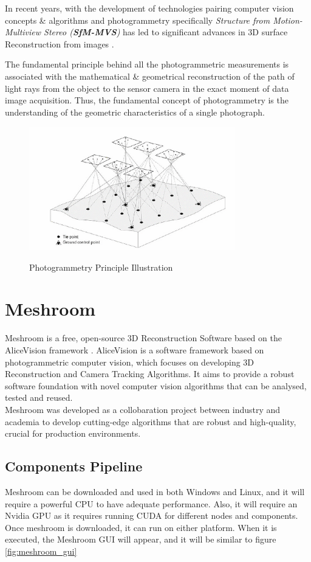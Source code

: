 \documentclass[12pt]{report}
\begin{document}
In recent years, with the development of technologies pairing computer vision concepts \& algorithms and photogrammetry specifically \textit{Structure from Motion-Multiview Stereo (\textbf{SfM-MVS})}
has led to significant advances in 3D surface Reconstruction from images .

The fundamental principle behind all the photogrammetric measurements is associated with the mathematical \& geometrical reconstruction of the path of light rays from the object to the sensor camera in the exact moment of data image acquisition.
Thus, the fundamental concept of photogrammetry is the understanding of the geometric characteristics of a single photograph.

\begin{figure}[h]
  \centering
  \includegraphics[width=0.8\textwidth]{photogrammetry.png}
  \caption{Photogrammetry Principle Illustration}\cite[]{photogrammetry_def}
  \label{fig:photogrammetry_principle} 
\end{figure}


\section{Meshroom}
\label{section:meshroom}
Meshroom is a free, open-source 3D Reconstruction Software based on the AliceVision framework .
AliceVision is a software framework based on photogrammetric computer vision, which focuses on developing 3D Reconstruction and Camera Tracking Algorithms.
It aims to provide a robust software foundation with novel computer vision algorithms that can be analysed, tested and reused.\\
Meshroom was developed as a collobaration project between industry and academia to develop cutting-edge algorithms that are robust and high-quality, crucial for production environments.

\subsection*{Components Pipeline}
Meshroom can be downloaded and used in both Windows and Linux, and it will require a powerful CPU  to have adequate performance. Also, it will require an Nvidia GPU as it requires running CUDA for different nodes and components.
Once meshroom is downloaded, it can run on either platform. When it is executed, the Meshroom GUI will appear, and it will be similar to figure \ref{fig:meshroom_gui}
\end{document}
